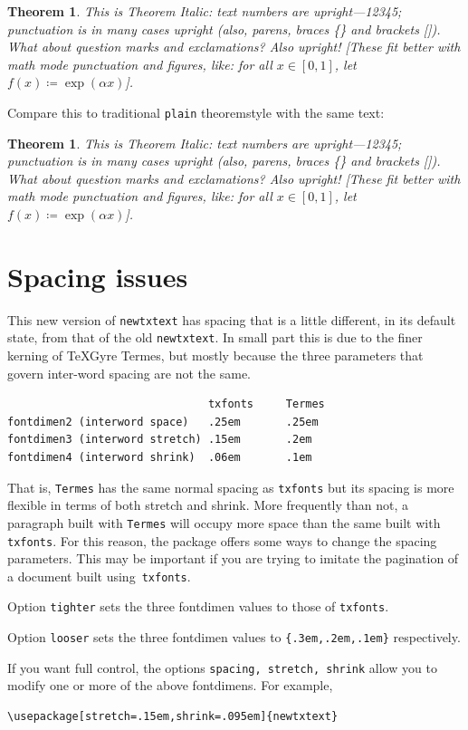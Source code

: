 \documentclass[11pt]{article}
\theoremstyle{oldplain}
\newtheorem{oldthm}{Theorem}[section]
\theoremstyle{plain}
\newtheorem{thm}{Theorem}[section]
\begin{document}
\begin{thm}
This is Theorem Italic: text numbers are upright---12345; punctuation is in many cases upright (also, parens, braces \{\} and brackets []). What about question marks and exclamations? Also upright! [These fit better with math mode punctuation and figures, like: for all $x\in[0,1]$, let $f(x)\coloneq \exp(\alpha x)$].
\end{thm}
Compare this to traditional {\tt plain} theoremstyle with the same text:
\begin{oldthm}
This is Theorem Italic: text numbers are upright---12345; punctuation is in many cases upright (also, parens, braces \{\} and brackets []). What about question marks and exclamations? Also upright! [These fit better with math mode punctuation and figures, like: for all $x\in[0,1]$, let $f(x)\coloneq \exp(\alpha x)$].
\end{oldthm}
\section{Spacing issues}
This new version of {\tt newtxtext} has spacing that is a little different, in its default state, from that of the old {\tt newtxtext}. In small part this is due to the finer kerning of TeXGyre Termes, but mostly because the three parameters that govern inter-word spacing are not the same.
\begin{verbatim}
                               txfonts     Termes
fontdimen2 (interword space)   .25em       .25em
fontdimen3 (interword stretch) .15em       .2em
fontdimen4 (interword shrink)  .06em       .1em
\end{verbatim}
That is, {\tt Termes} has the same normal spacing as {\tt txfonts} but its spacing is more flexible in terms of both stretch and shrink. More frequently than not, a paragraph built with {\tt Termes} will occupy more space than the same built with {\tt txfonts}. For this reason, the package offers some ways to change the spacing parameters. This may be important if you are trying to imitate the pagination of a document built using~{\tt txfonts}.

Option {\tt tighter} sets the three fontdimen values to those of {\tt txfonts}.  

Option {\tt looser} sets the three fontdimen values to \verb|{.3em,.2em,.1em}| respectively. 

If you want full control, the options {\tt spacing, stretch, shrink} allow you to modify one or more of the above fontdimens. For example,
\begin{verbatim}
\usepackage[stretch=.15em,shrink=.095em]{newtxtext}
\end{verbatim}
\end{document}
